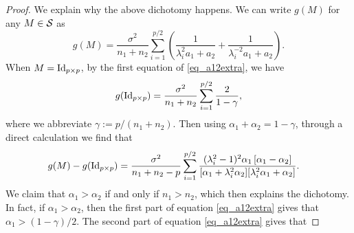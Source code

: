 \begin{example}
\begin{proof}
    We explain why the above dichotomy happens. We can write $g(M)$ for any $M \in \mathcal{S}$ as
    $$g(M)=\frac{\sigma^2}{ n_1+n_2 }\sum_{i=1}^{p/2}\left( \frac{1}{\lambda_i^{2} a_1 + a_2} + \frac1{\lambda_i^{-2} a_1 + a_2} \right).$$
    When $M=\operatorname{Id}_{p\times p}$, by the first equation of \eqref{eq_a12extra}, we have
    $$g(\operatorname{Id}_{p\times p})=\frac{\sigma^2}{ n_1+n_2 }\sum_{i=1}^{p/2} \frac{2}{1-\gamma},$$
    where we abbreviate $\gamma:=p/(n_1+n_2)$. Then using $\alpha_1 + \alpha_2 = 1-\gamma$, through a direct calculation we find that %
    \begin{align*}
        g(M) - g(\id_{p\times p})%
        &= \frac{\sigma^2 }{ n_1+n_2-p} \sum_{i=1}^{p/2} \frac{(\lambda_i^2-1)^2 \alpha_1 \left[ \alpha_1 - \alpha_2\right] }{[\alpha_1 + \lambda_i^2 \alpha_2][\lambda_i^2 \alpha_1 + \alpha_2]} .
    \end{align*}
    We claim that $\alpha_1 > \alpha_2$ if and only if $n_1 > n_2$, which then explains the dichotomy.
    In fact, if $\alpha_1 > \alpha_2$, then the first part of equation \eqref{eq_a12extra} gives that $\alpha_1 > (1-\gamma)/2$.
    The second part of equation \eqref{eq_a12extra} gives that

\end{proof}
\end{example}
